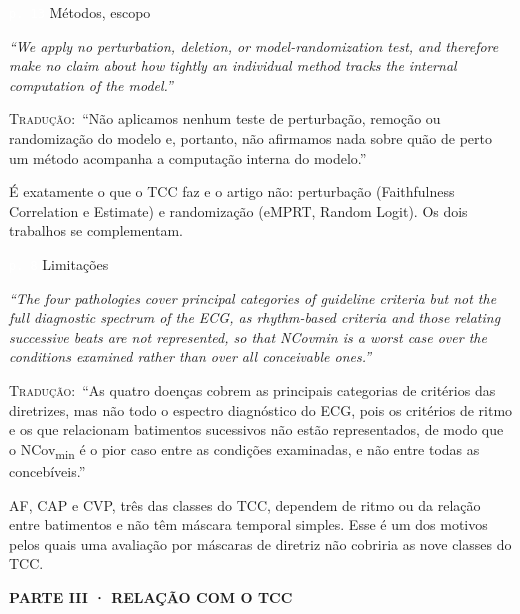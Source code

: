 \documentclass[11pt,a4paper]{article}
\newcommand{\pagechip}[1]{{\setlength{\fboxsep}{1.5pt}\colorbox{cAcc}{\textcolor{white}{\scriptsize\texttt{#1}}}}}
\newcommand{\partbar}[1]{\par\vspace{1.2em}\noindent\colorbox{black!80}{\parbox{\dimexpr\linewidth-2\fboxsep}{\color{white}\bfseries\sffamily\MakeUppercase{#1}}}\par\vspace{0.4em}}
\newenvironment{origquote}{\par\itshape\small}{\par}
\newenvironment{tradquote}{\par\small\textsc{Tradução:}\ }{\par}
\newcommand{\explab}[1]{\par\smallskip{\small\color{cAcc}\textbf{\MakeUppercase{#1}}}\par}
\begin{document}
\begin{citacard}{\pagechip{p. 13} Métodos, escopo}
\begin{origquote}“We apply no perturbation, deletion, or model-randomization test, and therefore make no claim about how tightly an individual method tracks the internal computation of the model.”\end{origquote}
\begin{tradquote}“Não aplicamos nenhum teste de perturbação, remoção ou randomização do modelo e, portanto, não afirmamos nada sobre quão de perto um método acompanha a computação interna do modelo.”\end{tradquote}
\explab{Explicação}
É exatamente o que o TCC faz e o artigo não: perturbação (Faithfulness Correlation e Estimate) e randomização (eMPRT, Random Logit). Os dois trabalhos se complementam.
\end{citacard}

\begin{citacard}{\pagechip{p. 8} Limitações}
\begin{origquote}“The four pathologies cover principal categories of guideline criteria but not the full diagnostic spectrum of the ECG, as rhythm-based criteria and those relating successive beats are not represented, so that NCovmin is a worst case over the conditions examined rather than over all conceivable ones.”\end{origquote}
\begin{tradquote}“As quatro doenças cobrem as principais categorias de critérios das diretrizes, mas não todo o espectro diagnóstico do ECG, pois os critérios de ritmo e os que relacionam batimentos sucessivos não estão representados, de modo que o NCov\textsubscript{min} é o pior caso entre as condições examinadas, e não entre todas as concebíveis.”\end{tradquote}
\explab{Explicação}
AF, CAP e CVP, três das classes do TCC, dependem de ritmo ou da relação entre batimentos e não têm máscara temporal simples. Esse é um dos motivos pelos quais uma avaliação por máscaras de diretriz não cobriria as nove classes do TCC.
\end{citacard}

\partbar{Parte III · Relação com o TCC}
\end{document}
